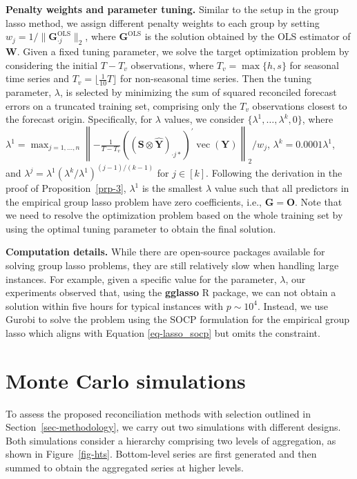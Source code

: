 \documentclass[
  11pt]{article}
\theoremstyle{plain}
\theoremstyle{remark}
\begin{document}
\textbf{Penalty weights and parameter tuning.} Similar to the setup in
the group lasso method, we assign different penalty weights to each
group by setting \(w_j = 1/\|\bm{G}_{\cdot j}^{\text{OLS}}\|_2\), where
\(\bm{G}^{\text{OLS}}\) is the solution obtained by the OLS estimator of
\(\bm{W}\). Given a fixed tuning parameter, we solve the target
optimization problem by considering the initial \(T-T_v\) observations,
where \(T_v = \max\{h, s\}\) for seasonal time series and
\(T_v = \lfloor \frac{1}{10}T \rfloor\) for non-seasonal time series.
Then the tuning parameter, \(\lambda\), is selected by minimizing the
sum of squared reconciled forecast errors on a truncated training set,
comprising only the \(T_v\) observations closest to the forecast origin.
Specifically, for \(\lambda\) values, we consider
\(\{\lambda^{1},\dots,\lambda^{k}, 0\}\), where
\(\lambda^{1} = \max_{j=1, \ldots, n}\left\|-\frac{1}{T-T_v}\left(\left(\bm{S} \otimes \hat{\bm{Y}}\right)_{\cdot j*}\right)^{\prime} \operatorname{vec}(\bm{Y})\right\|_2 / w_j\),
\(\lambda^{k} = 0.0001\lambda^{1}\), and
\(\lambda^{j} = \lambda^{1}\left(\lambda^{k} / \lambda^{1}\right)^{(j-1) / (k-1)}\)
for \(j \in [k]\). Following the derivation in the proof of
Proposition~\ref{prp-3}, \(\lambda^{1}\) is the smallest \(\lambda\)
value such that all predictors in the empirical group lasso problem have
zero coefficients, i.e., \(\bm{G} = \bm{O}\). Note that we need to
resolve the optimization problem based on the whole training set by
using the optimal tuning parameter to obtain the final solution.

\textbf{Computation details.} While there are open-source packages
available for solving group lasso problems, they are still relatively
slow when handling large instances. For example, given a specific value
for the parameter, \(\lambda\), our experiments observed that, using the
\textbf{gglasso} R package, we can not obtain a solution within five
hours for typical instances with \(p \sim 10^4\). Instead, we use Gurobi
to solve the problem using the SOCP formulation for the empirical group
lasso which aligns with Equation \eqref{eq-lasso_socp} but omits the
constraint.

\section{Monte Carlo simulations}\label{sec-simulations}

To assess the proposed reconciliation methods with selection outlined in
Section~\ref{sec-methodology}, we carry out two simulations with
different designs. Both simulations consider a hierarchy comprising two
levels of aggregation, as shown in Figure~\ref{fig-hts}. Bottom-level
series are first generated and then summed to obtain the aggregated
series at higher levels.
\end{document}
